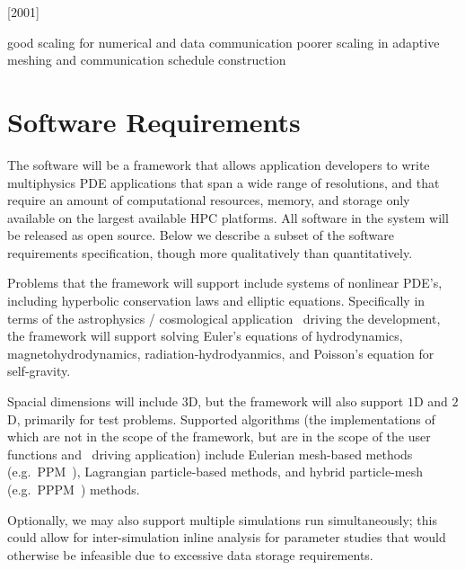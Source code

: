 \documentclass[10pt]{article}
\begin{document}
[2001]

good scaling for numerical and data communication
poorer scaling in adaptive meshing and communication schedule construction 

\subsubsection{\gadget } \label{sss:gadget}


\newpage
\section{Software Requirements} \label{s:requirements}


The software will be a framework that allows application developers to
write multiphysics PDE applications that span a wide range of
resolutions, and that require an amount of computational resources,
memory, and storage only available on the largest available HPC
platforms.  All software in the system will be released as open
source.  Below we describe a subset of the software requirements
specification, though more qualitatively than quantitatively.

Problems that the framework will support include systems of nonlinear
PDE's, including hyperbolic conservation laws and elliptic equations.
Specifically in terms of the astrophysics / cosmological application
\enzoii\ driving the development, the framework will support solving
Euler's equations of hydrodynamics, magnetohydrodynamics,
radiation-hydrodyanmics, and Poisson's equation for self-gravity.

Spacial dimensions will include $3$D, but the framework will also
support $1$D and $2$D, primarily for test problems.  Supported
algorithms (the implementations of which are not in the scope of the
framework, but are in the scope of the user functions and \enzoii\
driving application) include Eulerian mesh-based methods
(e.g.~PPM~\cite{WoCo84b}), Lagrangian particle-based methods, and
hybrid particle-mesh (e.g.~PPPM~\cite{HoEa88}) methods.

Optionally, we may also support multiple simulations run
simultaneously; this could allow for inter-simulation inline analysis
for parameter studies that would otherwise be infeasible due to
excessive data storage requirements.
\end{document}
